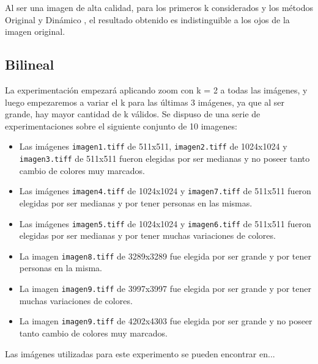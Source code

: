 \documentclass[a4paper]{article}
\newcounter{col}
\begin{document}
Al ser una imagen de alta calidad, para los primeros k considerados y los métodos Original y Dinámico , el resultado obtenido es indistinguible a los ojos de la imagen original.




\subsection{Bilineal}
La experimentaci\'on empezar\'a aplicando zoom con k = 2 a todas las im\'agenes, y luego empezaremos a variar el k para las \'ultimas 3 im\'agenes, ya que al ser grande, hay mayor cantidad de k v\'alidos.
Se dispuso de una serie de experimentaciones sobre el siguiente conjunto de 10 imagenes:\\
\begin{itemize}
	\item Las im\'agenes \texttt{imagen1.tiff} de 511x511, \texttt{imagen2.tiff} de 1024x1024 y \texttt{imagen3.tiff} de 511x511 fueron elegidas por ser medianas y no poseer tanto cambio de colores muy marcados.
	\item Las im\'agenes \texttt{imagen4.tiff} de 1024x1024 y \texttt{imagen7.tiff} de 511x511 fueron elegidas por ser medianas y por tener personas en las mismas.
	\item Las im\'agenes \texttt{imagen5.tiff} de 1024x1024 y \texttt{imagen6.tiff} de 511x511 fueron elegidas por ser medianas y por tener muchas variaciones de colores.
	\item La imagen \texttt{imagen8.tiff} de 3289x3289 fue elegida por ser grande y por tener personas en la misma.
	\item La imagen \texttt{imagen9.tiff} de 3997x3997 fue elegida por ser grande y por tener muchas variaciones de colores.
	\item La imagen \texttt{imagen9.tiff} de 4202x4303 fue elegida por ser grande y no poseer tanto cambio de colores muy marcados.
\end{itemize}
Las im\'agenes utilizadas para este experimento se pueden encontrar en...\\
\end{document}
